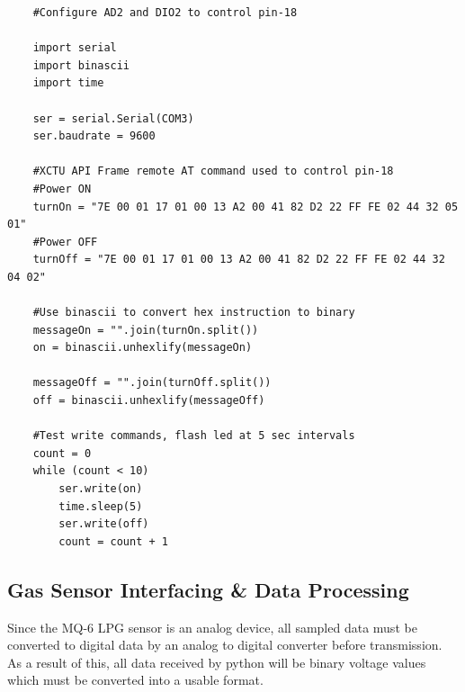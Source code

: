 	\begin{lstlisting}
	#Configure AD2 and DIO2 to control pin-18
	
	import serial
	import binascii
	import time
	
	ser = serial.Serial(COM3)
	ser.baudrate = 9600
	
	#XCTU API Frame remote AT command used to control pin-18
	#Power ON
	turnOn = "7E 00 01 17 01 00 13 A2 00 41 82 D2 22 FF FE 02 44 32 05 01"
	#Power OFF
	turnOff = "7E 00 01 17 01 00 13 A2 00 41 82 D2 22 FF FE 02 44 32 04 02"
	
	#Use binascii to convert hex instruction to binary
	messageOn = "".join(turnOn.split()) 
	on = binascii.unhexlify(messageOn)
	
	messageOff = "".join(turnOff.split())
	off = binascii.unhexlify(messageOff)
	
	#Test write commands, flash led at 5 sec intervals
	count = 0
	while (count < 10)
		ser.write(on)
		time.sleep(5)
		ser.write(off)
		count = count + 1
	\end{lstlisting}
	
	\subsection{Gas Sensor Interfacing \& Data Processing}
		Since the MQ-6 LPG sensor is an analog device, all sampled data must be converted to digital data by an analog to digital converter before transmission. As a result of this, all data received by python will be binary voltage values which must be converted into a usable format. 

